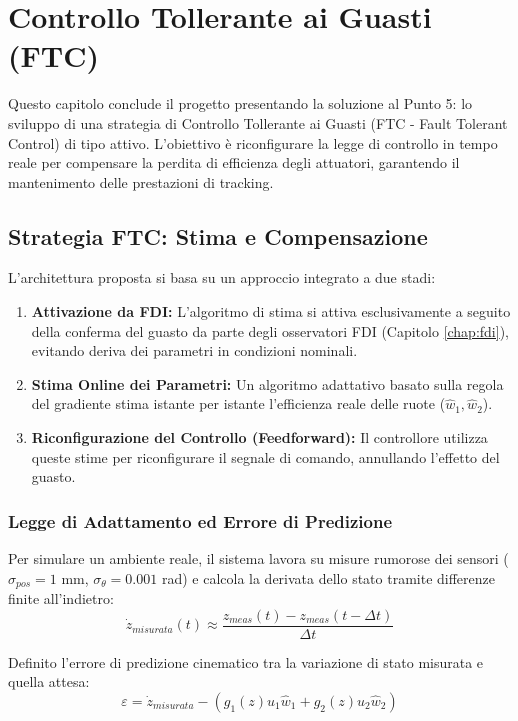 \chapter{Controllo Tollerante ai Guasti (FTC)} \label{chap:ftc}

Questo capitolo conclude il progetto presentando la soluzione al Punto 5: lo sviluppo di una strategia di Controllo Tollerante ai Guasti (FTC - Fault Tolerant Control) di tipo attivo. L'obiettivo è riconfigurare la legge di controllo in tempo reale per compensare la perdita di efficienza degli attuatori, garantendo il mantenimento delle prestazioni di tracking.

\section{Strategia FTC: Stima e Compensazione}
L'architettura proposta si basa su un approccio integrato a due stadi:
\begin{enumerate}
    \item \textbf{Attivazione da FDI:} L'algoritmo di stima si attiva esclusivamente a seguito della conferma del guasto da parte degli osservatori FDI (Capitolo \ref{chap:fdi}), evitando deriva dei parametri in condizioni nominali.
    \item \textbf{Stima Online dei Parametri:} Un algoritmo adattativo basato sulla regola del gradiente stima istante per istante l'efficienza reale delle ruote (\( \hat{w}_1, \hat{w}_2 \)).
    \item \textbf{Riconfigurazione del Controllo (Feedforward):} Il controllore utilizza queste stime per riconfigurare il segnale di comando, annullando l'effetto del guasto.
\end{enumerate}

\subsection{Legge di Adattamento ed Errore di Predizione}
Per simulare un ambiente reale, il sistema lavora su misure rumorose dei sensori (\( \sigma_{pos} = 1 \) mm, \( \sigma_{\theta} = 0.001 \) rad) e calcola la derivata dello stato tramite differenze finite all'indietro:
\begin{equation}
    \dot{z}_{misurata}(t) \approx \frac{z_{meas}(t) - z_{meas}(t-\Delta t)}{\Delta t}
\end{equation}

Definito l'errore di predizione cinematico tra la variazione di stato misurata e quella attesa:
\begin{equation}
    \varepsilon = \dot{z}_{misurata} - \left( g_1(z) u_1 \hat{w}_1 + g_2(z) u_2 \hat{w}_2 \right)
\end{equation}

